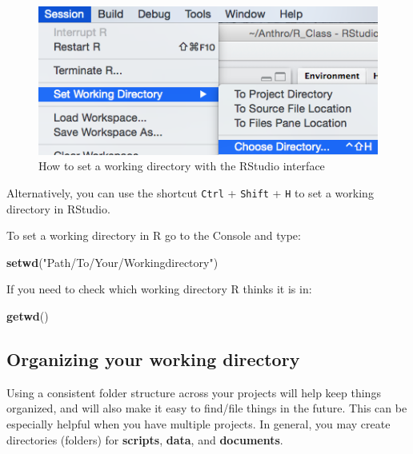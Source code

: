 \documentclass[
]{book}
\newenvironment{Shaded}{\begin{snugshade}}{\end{snugshade}}
\newcommand{\KeywordTok}[1]{\textcolor[rgb]{0.13,0.29,0.53}{\textbf{#1}}}
\newcommand{\NormalTok}[1]{#1}
\newcommand{\StringTok}[1]{\textcolor[rgb]{0.31,0.60,0.02}{#1}}
\begin{document}
\begin{figure}
\includegraphics[width=0.6\linewidth]{img/setWD} \caption{How to set a working directory with the RStudio interface}\label{fig:set-working-dir}
\end{figure}

Alternatively, you can use the shortcut \texttt{Ctrl} + \texttt{Shift} + \texttt{H} to set a working directory in RStudio.

To set a working directory in R go to the Console and type:

\begin{Shaded}
\begin{Highlighting}[]
\KeywordTok{setwd}\NormalTok{(}\StringTok{"Path/To/Your/Workingdirectory"}\NormalTok{)}
\end{Highlighting}
\end{Shaded}

If you need to check which working directory R thinks it is in:

\begin{Shaded}
\begin{Highlighting}[]
\KeywordTok{getwd}\NormalTok{()}
\end{Highlighting}
\end{Shaded}

\hypertarget{organizing-your-working-directory}{%
\subsection{Organizing your working directory}\label{organizing-your-working-directory}}

Using a consistent folder structure across your projects will help keep things
organized, and will also make it easy to find/file things in the future. This
can be especially helpful when you have multiple projects. In general, you may
create directories (folders) for \textbf{scripts}, \textbf{data}, and \textbf{documents}.
\end{document}
